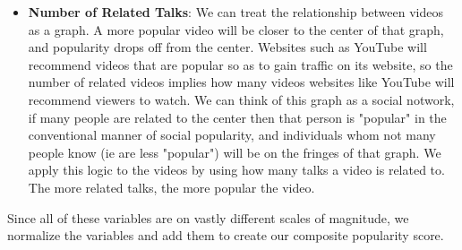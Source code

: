 \begin{itemize}
	\item \textbf{Number of Related Talks}: We can treat the relationship between videos as a graph. A more popular video will be closer to the center of that graph, and popularity drops off from the center. Websites such as YouTube will recommend videos that are popular so as to gain traffic on its website, so the number of related videos implies how many videos websites like YouTube will recommend viewers to watch. We can think of this graph as a social notwork, if many people are related to the center then that person is "popular" in the conventional manner of social popularity, and individuals whom not many people know (ie are less "popular") will be on the fringes of that graph. We apply this logic to the videos by using how many talks a video is related to. The more related talks, the more popular the video.
\end{itemize}
Since all of these variables are on vastly different scales of magnitude, we normalize the variables and add them to create our composite popularity score. 

